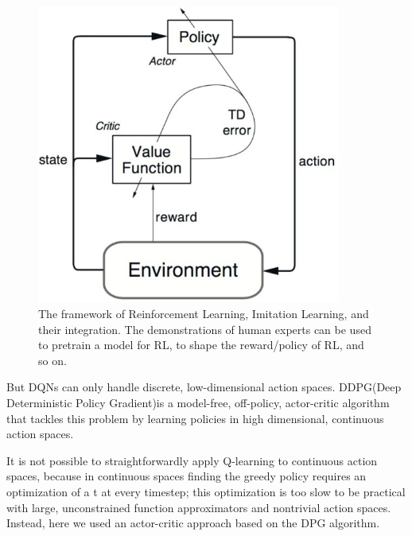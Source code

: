\begin{figure}[t]
 \centering
  \captionsetup{width=10cm}
  \includegraphics[width=10cm]{./img/ac}
  \caption{The framework of Reinforcement Learning, Imitation Learning, and their integration. The demonstrations of human experts can be used to pretrain a model for RL, to shape the reward/policy of RL, and so on.}
   \label{fig:cinesi}
\end{figure}


But DQNs can only handle discrete, low-dimensional action spaces. DDPG(Deep Deterministic Policy Gradient)is a model-free, off-policy, actor-critic algorithm that tackles this problem by learning policies in high dimensional, continuous action spaces.

It is not possible to straightforwardly apply Q-learning to continuous action spaces, because in continuous spaces finding the greedy policy requires an optimization of a t at every timestep; this optimization is too slow to be practical with large, unconstrained function approximators and nontrivial action spaces. Instead, here we used an actor-critic approach based on the DPG algorithm.


